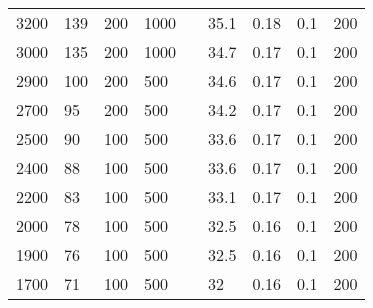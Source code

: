 \documentclass{article}
\begin{document}
\begin{table}[H]
\begin{tabular}{|l|l|l|l|l|l|l|l|l|}
        3200          & 139                       & 200                       & 1000                      &  & 35.1       & 0.18                      & 0.1                       & 200                       \\ \cline{1-4} \cline{6-9}
        3000          & 135                       & 200                       & 1000                      &  & 34.7       & 0.17                      & 0.1                       & 200                       \\ \cline{1-4} \cline{6-9}
        2900          & 100                       & 200                       & 500                       &  & 34.6       & 0.17                      & 0.1                       & 200                       \\ \cline{1-4} \cline{6-9}
        2700          & 95                        & 200                       & 500                       &  & 34.2       & 0.17                      & 0.1                       & 200                       \\ \cline{1-4} \cline{6-9}
        2500          & 90                        & 100                       & 500                       &  & 33.6       & 0.17                      & 0.1                       & 200                       \\ \cline{1-4} \cline{6-9}
        2400          & 88                        & 100                       & 500                       &  & 33.6       & 0.17                      & 0.1                       & 200                       \\ \cline{1-4} \cline{6-9}
        2200          & 83                        & 100                       & 500                       &  & 33.1       & 0.17                      & 0.1                       & 200                       \\ \cline{1-4} \cline{6-9}
        2000          & 78                        & 100                       & 500                       &  & 32.5       & 0.16                      & 0.1                       & 200                       \\ \cline{1-4} \cline{6-9}
        1900          & 76                        & 100                       & 500                       &  & 32.5       & 0.16                      & 0.1                       & 200                       \\ \cline{1-4} \cline{6-9}
        1700          & 71                        & 100                       & 500                       &  & 32         & 0.16                      & 0.1                       & 200                       \\ \cline{1-4} \cline{6-9}

\end{tabular}
\end{table}
\end{document}

